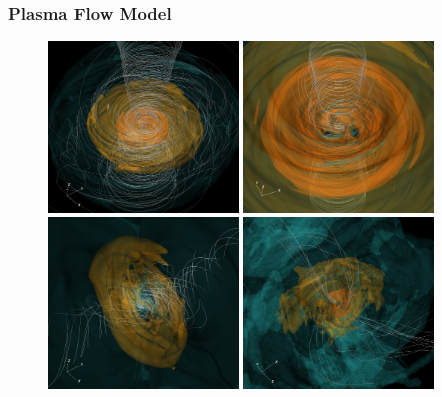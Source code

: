 \subsubsection{Plasma Flow Model}

\begin{figure}
  \centering
  \includegraphics[width=0.45\textwidth]{figures/sane_3D.png}\hspace{1.5pt}%
  \includegraphics[width=0.45\textwidth]{figures/mad_3D_new.png}\\
  \includegraphics[width=0.45\textwidth]{figures/tilted_3D.png}\hspace{1.5pt}%
  \includegraphics[width=0.45\textwidth]{figures/ressler_3D_new.png}

\end{figure}
